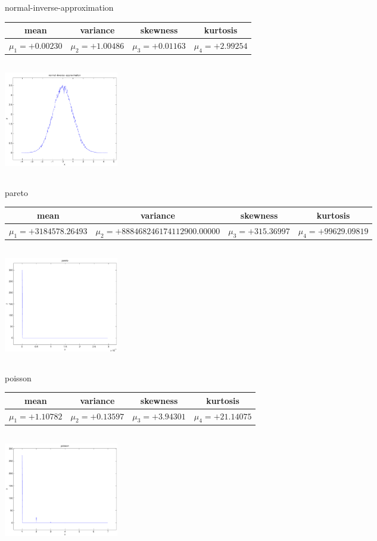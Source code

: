 \documentclass[9pt]{article}
\theoremstyle{plain}
\theoremstyle{definition}
\theoremstyle{remark}
\numberwithin{equation}{section}
\begin{document}
\newpage
normal-inverse-approximation \begin{tabular}{|c|c|c|c|}  mean & variance & skewness & kurtosis \\  \hline
$\mu_1 = +0.00230$ & $\mu_2 = +1.00486$ & $\mu_3 = +0.01163$ & $\mu_4 =+2.99254$ \\
\end{tabular}

\includegraphics[width=5cm,height=5cm]{normal-inverse-approximation.pdf}

pareto \begin{tabular}{|c|c|c|c|}  mean & variance & skewness & kurtosis \\  \hline
$\mu_1 = +3184578.26493$ & $\mu_2 = +888468246174112900.00000$ & $\mu_3 = +315.36997$ & $\mu_4 =+99629.09819$ \\
\end{tabular}

\includegraphics[width=5cm,height=5cm]{pareto.pdf}

poisson \begin{tabular}{|c|c|c|c|}  mean & variance & skewness & kurtosis \\  \hline
$\mu_1 = +1.10782$ & $\mu_2 = +0.13597$ & $\mu_3 = +3.94301$ & $\mu_4 =+21.14075$ \\
\end{tabular}

\includegraphics[width=5cm,height=5cm]{poisson.pdf}
\end{document}
